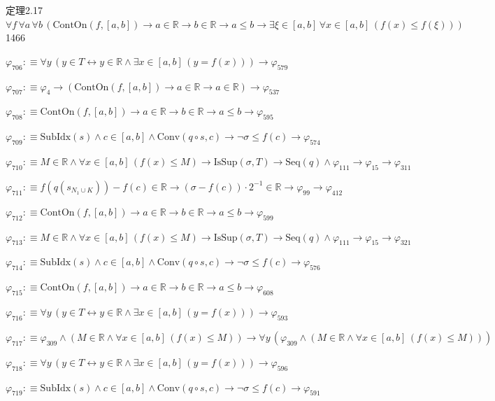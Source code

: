 \begin{fullproof}{定理2.17}{$\forall f\,\forall a\,\forall b\,(\mathrm{ContOn}(f,[a,b]) \to a \in \mathbb{R} \to b \in \mathbb{R} \to a \leq b \to \exists \xi \in [a,b]\,\forall x \in [a,b]\,(f(x) \leq f(\xi)))$}{1466}
\begin{abbrevlist}
\item $\varphi_{706} :\equiv \forall y\,(y \in T \leftrightarrow y \in \mathbb{R} \land \exists x \in [a,b]\,(y = f(x))) \to \varphi_{579}$
\item $\varphi_{707} :\equiv \varphi_{4} \to (\mathrm{ContOn}(f,[a,b]) \to a \in \mathbb{R} \to a \in \mathbb{R}) \to \varphi_{537}$
\item $\varphi_{708} :\equiv \mathrm{ContOn}(f,[a,b]) \to a \in \mathbb{R} \to b \in \mathbb{R} \to a \leq b \to \varphi_{595}$
\item $\varphi_{709} :\equiv \mathrm{SubIdx}(s) \land c \in [a,b] \land \mathrm{Conv}(q \circ s,c) \to \neg \sigma \leq f(c) \to \varphi_{574}$
\item $\varphi_{710} :\equiv M \in \mathbb{R} \land \forall x \in [a,b]\,(f(x) \leq M) \to \mathrm{IsSup}(\sigma,T) \to \mathrm{Seq}(q) \land \varphi_{111} \to \varphi_{15} \to \varphi_{311}$
\item $\varphi_{711} :\equiv f(q(s_{N_{1} \cup K})) - f(c) \in \mathbb{R} \to (\sigma - f(c)) \cdot 2^{-1} \in \mathbb{R} \to \varphi_{99} \to \varphi_{412}$
\item $\varphi_{712} :\equiv \mathrm{ContOn}(f,[a,b]) \to a \in \mathbb{R} \to b \in \mathbb{R} \to a \leq b \to \varphi_{599}$
\item $\varphi_{713} :\equiv M \in \mathbb{R} \land \forall x \in [a,b]\,(f(x) \leq M) \to \mathrm{IsSup}(\sigma,T) \to \mathrm{Seq}(q) \land \varphi_{111} \to \varphi_{15} \to \varphi_{321}$
\item $\varphi_{714} :\equiv \mathrm{SubIdx}(s) \land c \in [a,b] \land \mathrm{Conv}(q \circ s,c) \to \neg \sigma \leq f(c) \to \varphi_{576}$
\item $\varphi_{715} :\equiv \mathrm{ContOn}(f,[a,b]) \to a \in \mathbb{R} \to b \in \mathbb{R} \to a \leq b \to \varphi_{608}$
\item $\varphi_{716} :\equiv \forall y\,(y \in T \leftrightarrow y \in \mathbb{R} \land \exists x \in [a,b]\,(y = f(x))) \to \varphi_{593}$
\item $\varphi_{717} :\equiv \varphi_{309} \land (M \in \mathbb{R} \land \forall x \in [a,b]\,(f(x) \leq M)) \to \forall y\,(\varphi_{309} \land (M \in \mathbb{R} \land \forall x \in [a,b]\,(f(x) \leq M)))$
\item $\varphi_{718} :\equiv \forall y\,(y \in T \leftrightarrow y \in \mathbb{R} \land \exists x \in [a,b]\,(y = f(x))) \to \varphi_{596}$
\item $\varphi_{719} :\equiv \mathrm{SubIdx}(s) \land c \in [a,b] \land \mathrm{Conv}(q \circ s,c) \to \neg \sigma \leq f(c) \to \varphi_{591}$

\end{abbrevlist}
\end{fullproof}
